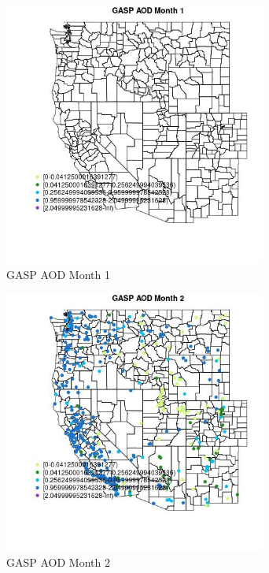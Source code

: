 \begin{figure} 
\centering  
\includegraphics[width=0.77\textwidth]{Code_Outputs/Report_ML_input_PM25_Step4_part_e_de_duplicated_aves_compiled_2019-05-18wNAs_MapObsMo1GASP_AOD.jpg} 
\caption{\label{fig:Report_ML_input_PM25_Step4_part_e_de_duplicated_aves_compiled_2019-05-18wNAsMapObsMo1GASP_AOD}GASP AOD Month 1} 
\end{figure} 
 

\begin{figure} 
\centering  
\includegraphics[width=0.77\textwidth]{Code_Outputs/Report_ML_input_PM25_Step4_part_e_de_duplicated_aves_compiled_2019-05-18wNAs_MapObsMo2GASP_AOD.jpg} 
\caption{\label{fig:Report_ML_input_PM25_Step4_part_e_de_duplicated_aves_compiled_2019-05-18wNAsMapObsMo2GASP_AOD}GASP AOD Month 2} 
\end{figure} 
 

